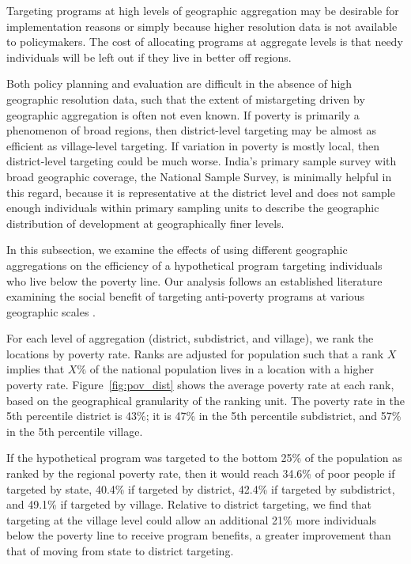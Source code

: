 \documentclass[12pt,letterpaper]{article}
\begin{document}
Targeting programs at high levels of geographic aggregation may be desirable for implementation reasons or simply because higher resolution data is not available to policymakers. The cost of allocating programs at aggregate levels is that needy individuals will be left out if they live in better off regions.

Both policy planning and evaluation are difficult in the absence of
high geographic resolution data, such that the extent of mistargeting
driven by geographic aggregation is often not even known. If poverty
is primarily a phenomenon of broad regions, then district-level
targeting may be almost as efficient as village-level targeting. If
variation in poverty is mostly local, then district-level targeting
could be much worse. India's primary sample survey with broad
geographic coverage, the National Sample Survey, is minimally helpful
in this regard, because it is representative at the district level and
does not sample enough individuals within primary sampling units to
describe the geographic distribution of development at geographically
finer levels.

In this subsection, we examine the effects of using different geographic aggregations on the efficiency of a hypothetical program targeting individuals who live below the poverty line. Our analysis follows an established literature examining the social benefit of targeting anti-poverty programs at various geographic scales \cite{ravallion1993,baker1994,bigman2000,bigman2002,elbers2007,brown2019}.

For each level of aggregation (district, subdistrict, and village), we rank the locations by poverty rate. Ranks are adjusted for population such that a rank $X$ implies that $X\%$ of the national population lives in a location with a higher poverty rate. Figure~\ref{fig:pov_dist} shows the average poverty rate at each rank, based on the geographical granularity of the ranking unit. The poverty rate in the 5th percentile district is 43\%; it is 47\% in the 5th percentile subdistrict, and 57\% in the 5th percentile village.

If the hypothetical program was targeted to the bottom 25\% of the population as ranked by the regional poverty rate, then it would reach 34.6\% of poor people if targeted by state, 40.4\% if targeted by district, 42.4\% if targeted by subdistrict, and 49.1\% if targeted by village. Relative to district targeting, we find that targeting at the village level could allow an additional 21\% more individuals below the poverty line to receive program benefits, a greater improvement than that of moving from state to district targeting.
\end{document}
